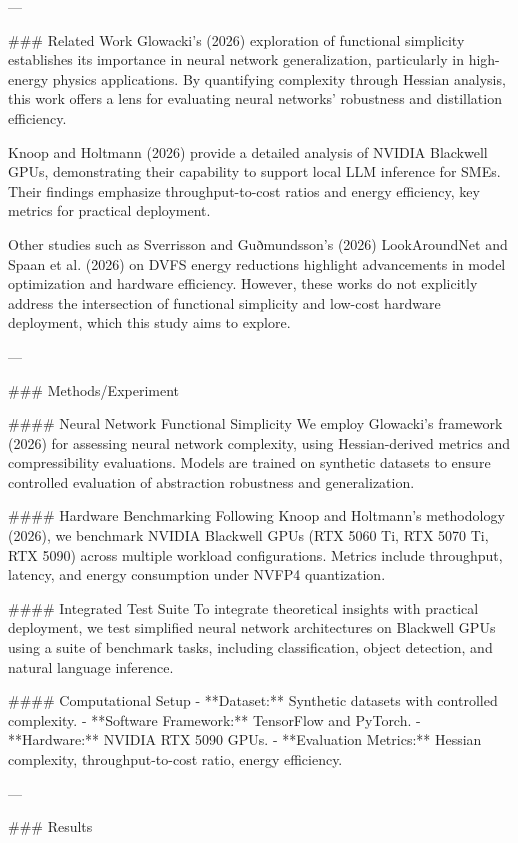 ---

### Related Work  
Glowacki's (2026) exploration of functional simplicity establishes its importance in neural network generalization, particularly in high-energy physics applications. By quantifying complexity through Hessian analysis, this work offers a lens for evaluating neural networks' robustness and distillation efficiency.

Knoop and Holtmann (2026) provide a detailed analysis of NVIDIA Blackwell GPUs, demonstrating their capability to support local LLM inference for SMEs. Their findings emphasize throughput-to-cost ratios and energy efficiency, key metrics for practical deployment.

Other studies such as Sverrisson and Guðmundsson's (2026) LookAroundNet and Spaan et al. (2026) on DVFS energy reductions highlight advancements in model optimization and hardware efficiency. However, these works do not explicitly address the intersection of functional simplicity and low-cost hardware deployment, which this study aims to explore.

---

### Methods/Experiment  

#### Neural Network Functional Simplicity  
We employ Glowacki's framework (2026) for assessing neural network complexity, using Hessian-derived metrics and compressibility evaluations. Models are trained on synthetic datasets to ensure controlled evaluation of abstraction robustness and generalization.

#### Hardware Benchmarking  
Following Knoop and Holtmann's methodology (2026), we benchmark NVIDIA Blackwell GPUs (RTX 5060 Ti, RTX 5070 Ti, RTX 5090) across multiple workload configurations. Metrics include throughput, latency, and energy consumption under NVFP4 quantization.

#### Integrated Test Suite  
To integrate theoretical insights with practical deployment, we test simplified neural network architectures on Blackwell GPUs using a suite of benchmark tasks, including classification, object detection, and natural language inference.

#### Computational Setup  
- **Dataset:** Synthetic datasets with controlled complexity.  
- **Software Framework:** TensorFlow and PyTorch.  
- **Hardware:** NVIDIA RTX 5090 GPUs.  
- **Evaluation Metrics:** Hessian complexity, throughput-to-cost ratio, energy efficiency.

---

### Results  

